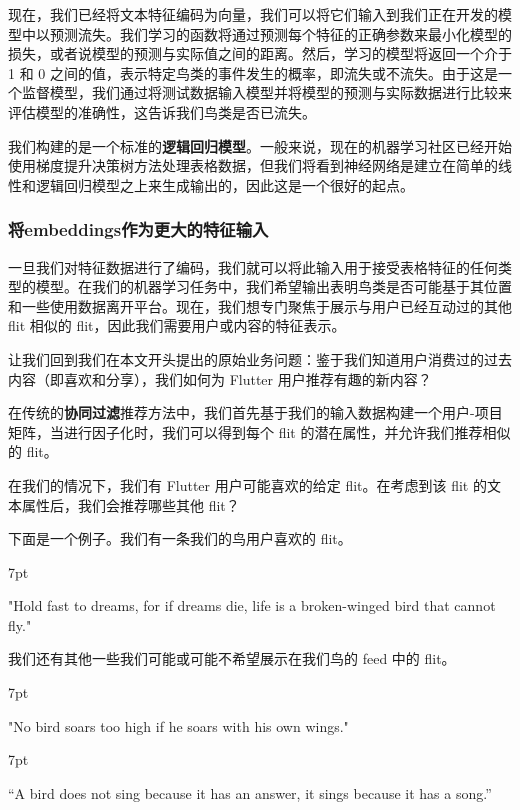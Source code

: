 \documentclass[Chinese, 11pt, table]{diazessay} %
\newenvironment{formal}{%
  \def\FrameCommand{%
	\hspace{1pt}%
	{\color{w_lightblue}\vrule width 2pt}%
	{\color{formalshade}\vrule width 4pt}%
	\colorbox{formalshade}%
  }%
  \MakeFramed{\advance\hsize-\width\FrameRestore}%
  \noindent\hspace{-4.55pt}%
  \begin{adjustwidth}{}{7pt}%
  \vspace{2pt}\vspace{2pt}%
}
{%
  \vspace{2pt}\end{adjustwidth}\endMakeFramed%
}
\begin{document}
\begin{CJK}{UTF8}{gbsn}
\begin{sloppypar}
现在，我们已经将文本特征编码为向量，我们可以将它们输入到我们正在开发的模型中以预测流失。我们学习的函数将通过预测每个特征的正确参数来最小化模型的损失，或者说模型的预测与实际值之间的距离。然后，学习的模型将返回一个介于 1 和 0 之间的值，表示特定鸟类的事件发生的概率，即流失或不流失。由于这是一个监督模型，我们通过将测试数据输入模型并将模型的预测与实际数据进行比较来评估模型的准确性，这告诉我们鸟类是否已流失。

我们构建的是一个标准的\textbf{逻辑回归模型}。一般来说，现在的机器学习社区已经开始使用梯度提升决策树方法处理表格数据，但我们将看到神经网络是建立在简单的线性和逻辑回归模型之上来生成输出的，因此这是一个很好的起点。

\subsubsection*{将embeddings作为更大的特征输入}

一旦我们对特征数据进行了编码，我们就可以将此输入用于接受表格特征的任何类型的模型。在我们的机器学习任务中，我们希望输出表明鸟类是否可能基于其位置和一些使用数据离开平台。现在，我们想专门聚焦于展示与用户已经互动过的其他 flit 相似的 flit，因此我们需要用户或内容的特征表示。

让我们回到我们在本文开头提出的原始业务问题：鉴于我们知道用户消费过的过去内容（即喜欢和分享），我们如何为 Flutter 用户推荐有趣的新内容？

在传统的\textbf{协同过滤}推荐方法中，我们首先基于我们的输入数据构建一个用户-项目矩阵，当进行因子化时，我们可以得到每个 flit 的潜在属性，并允许我们推荐相似的 flit。

在我们的情况下，我们有 Flutter 用户可能喜欢的给定 flit。在考虑到该 flit 的文本属性后，我们会推荐哪些其他 flit？

下面是一个例子。我们有一条我们的鸟用户喜欢的 flit。

\begin{formal}
    "Hold fast to dreams, for if dreams die, life is a broken-winged bird that cannot fly."
\end{formal}

我们还有其他一些我们可能或可能不希望展示在我们鸟的 feed 中的 flit。

\begin{formal}
"No bird soars too high if he soars with his own wings."
\end{formal}

\begin{formal}
“A bird does not sing because it has an answer, it sings because it has a song.”
\end{formal}


\end{sloppypar}
\end{CJK}
\end{document}
